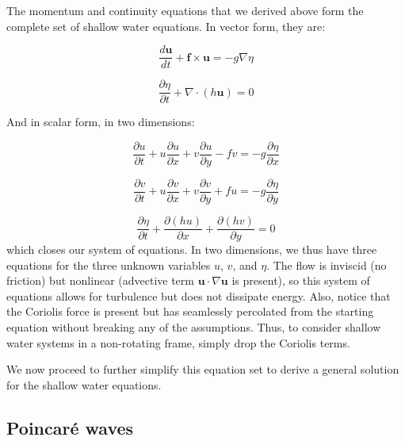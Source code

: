 \documentclass[12pt]{article}
\numberwithin{equation}{section}
\numberwithin{figure}{section}
\numberwithin{table}{section}
\begin{document}
The momentum and continuity equations that we derived above form the complete
set of shallow water equations.
In vector form, they are:

\begin{equation}
  \frac{d \mathbf{u}}{dt} + \mathbf{f} \times \mathbf{u} =
  - g \nabla \eta
  \label{eq:shallow_water_final_momentum}
\end{equation}

\begin{equation}
  \frac{\partial \eta}{\partial t} + \nabla \cdot (h \mathbf{u}) = 0
  \label{eq:shallow_water_final_continuity}
\end{equation}

And in scalar form, in two dimensions:

\begin{equation}
  \frac{\partial u}{\partial t} +
  u \frac{\partial u}{\partial x} +
  v \frac{\partial u}{\partial y} -
  f v = 
  -g \frac{\partial \eta}{\partial x}
  \label{eq:shallow_water_final_scalar_u}
\end{equation}

\begin{equation}
  \frac{\partial v}{\partial t} +
  u \frac{\partial v}{\partial x} +
  v \frac{\partial v}{\partial y} +
  f u =
  -g \frac{\partial \eta}{\partial y}
  \label{eq:shallow_water_final_scalar_v}
\end{equation}

\begin{equation}
  \frac{\partial \eta}{\partial t} +
  \frac{\partial (hu)}{\partial x} +
  \frac{\partial (hv)}{\partial y} = 0
  \label{eq:shallow_water_final_scalar_eta}
\end{equation}
which closes our system of equations.
In two dimensions, we thus have three equations for the three unknown
variables $u$, $v$, and $\eta$.
The flow is inviscid (no friction) but nonlinear (advective term
$\mathbf{u} \cdot \nabla \mathbf{u}$ is present), so this system of equations
allows for turbulence but does not dissipate energy.
Also, notice that the Coriolis force is present but has seamlessly percolated
from the starting equation without breaking any of the assumptions.
Thus, to consider shallow water systems in a non-rotating frame, simply drop
the Coriolis terms.

We now proceed to further simplify this equation set to derive a general
solution for the shallow water equations.

\subsection{Poincaré waves}
\label{sec:poincare_waves}
\end{document}
